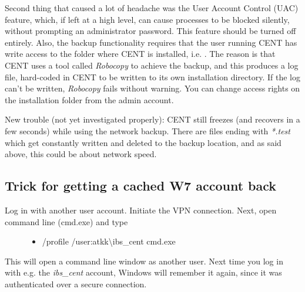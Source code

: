 \documentclass[letterpaper,10pt,english]{sphinxmanual}
\begin{document}
Second thing that caused a lot of headache was the User Account Control (UAC) feature, which, if left at a high level, can cause processes to be blocked silently, without prompting an administrator password. This feature should be turned off entirely. Also, the backup functionality requires that the user running CENT has write access to the folder where CENT is installed, i.e. . The reason is that CENT uses a tool called \emph{Robocopy} to achieve the backup, and this produces a log file, hard-coded in CENT to be written to its own installation directory. If the log can't be written, \emph{Robocopy} fails without warning. You can change access rights on the installation folder from the admin account.

New trouble (not yet investigated properly): CENT still freezes (and recovers in a few seconds) while using the network backup. There are files ending with \emph{*.test} which get constantly written and deleted to the backup location, and as said above, this could be about network speed.


\subsection{\textbf{Trick for getting a cached W7 account back}}
\label{index:trick-for-getting-a-cached-w7-account-back}\label{index:cached-acc-trick}\begin{description}
\item[{Log in with another user account. Initiate the VPN connection. Next, open command line (cmd.exe) and type}] \leavevmode\begin{itemize}
\item {} 
/profile /user:atkk\textbackslash{}ibs\_cent cmd.exe

\end{itemize}

\end{description}

This will open a command line window as another user. Next time you log in with e.g. the \emph{ibs\_cent} account, Windows will remember it again, since it was authenticated over a secure connection.



\renewcommand{\indexname}{Index}
\printindex
\end{document}
